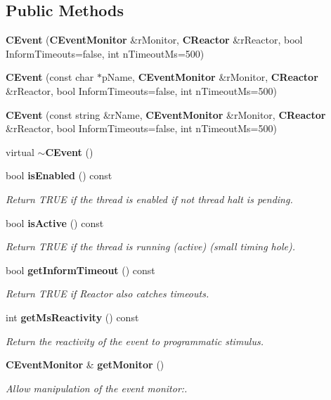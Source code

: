 \subsection*{Public Methods}
\begin{CompactItemize}
\item 
{\bf CEvent} ({\bf CEvent\-Monitor} \&r\-Monitor, {\bf CReactor} \&r\-Reactor, bool Inform\-Timeouts=false, int n\-Timeout\-Ms=500)
\item 
{\bf CEvent} (const char $\ast$p\-Name, {\bf CEvent\-Monitor} \&r\-Monitor, {\bf CReactor} \&r\-Reactor, bool Inform\-Timeouts=false, int n\-Timeout\-Ms=500)
\item 
{\bf CEvent} (const string \&r\-Name, {\bf CEvent\-Monitor} \&r\-Monitor, {\bf CReactor} \&r\-Reactor, bool Inform\-Timeouts=false, int n\-Timeout\-Ms=500)
\item 
virtual {\bf $\sim$CEvent} ()
\item 
bool {\bf is\-Enabled} () const
\begin{CompactList}\small\item\em Return TRUE if the thread is enabled if not thread halt is pending.\item\end{CompactList}\item 
bool {\bf is\-Active} () const
\begin{CompactList}\small\item\em Return TRUE if the thread is running (active) (small timing hole).\item\end{CompactList}\item 
bool {\bf get\-Inform\-Timeout} () const
\begin{CompactList}\small\item\em Return TRUE if Reactor also catches timeouts.\item\end{CompactList}\item 
int {\bf get\-Ms\-Reactivity} () const
\begin{CompactList}\small\item\em Return the reactivity of the event to programmatic stimulus.\item\end{CompactList}\item 
{\bf CEvent\-Monitor} \& {\bf get\-Monitor} ()
\begin{CompactList}\small\item\em Allow manipulation of the event monitor:.\item\end{CompactList}\item 

\end{CompactItemize}
